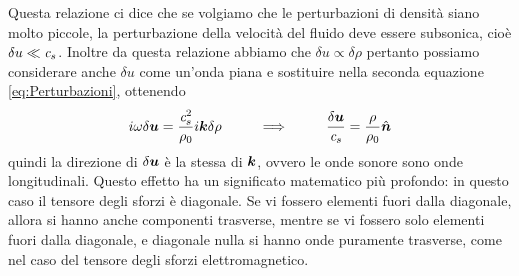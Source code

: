 Questa relazione ci dice che se volgiamo che le perturbazioni di densità siano molto piccole, la perturbazione della velocità del fluido deve essere subsonica, cioè $\delta u \ll \textit{c}_{s}$. Inoltre da questa relazione abbiamo che $\delta u \propto \delta \rho$ pertanto possiamo considerare anche $\delta u $ come un'onda piana e sostituire nella seconda equazione \ref{eq:Perturbazioni}, ottenendo
\begin{equation}
i\omega \delta \V{u} = \dfrac{\sound^2}{\rho_0} i\V{k}\delta\rho \,\,\,\,\,\,\,\,\,\,\,\,\,\,\,\, \Longrightarrow \,\,\,\,\,\,\,\,\,\,\,\,\,\,\,\, \dfrac{\delta \V{u}}{\sound} = \dfrac{\rho}{\rho_0} \V{\hat{n}}
\end{equation}
quindi la direzione di $\delta \V{u}$ è la stessa di $\V{k}$, ovvero le onde sonore sono onde longitudinali. Questo effetto ha un significato matematico più profondo: in questo caso il tensore degli sforzi è diagonale. Se vi fossero elementi fuori dalla diagonale, allora si hanno anche componenti trasverse, mentre se vi fossero solo elementi fuori dalla diagonale, e diagonale nulla si hanno onde puramente trasverse, come nel caso del tensore degli sforzi elettromagnetico.

